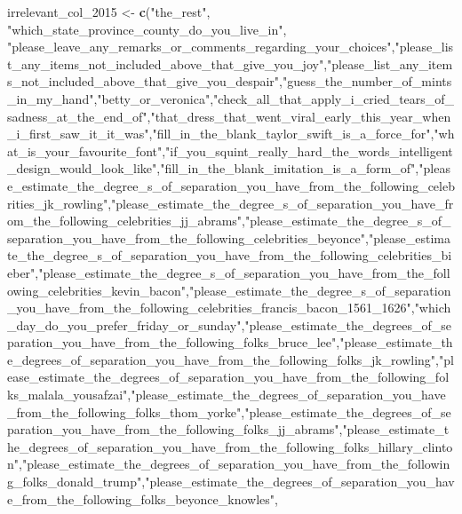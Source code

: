 \documentclass[
]{article}
\newenvironment{Shaded}{\begin{snugshade}}{\end{snugshade}}
\newcommand{\FunctionTok}[1]{\textcolor[rgb]{0.13,0.29,0.53}{\textbf{#1}}}
\newcommand{\NormalTok}[1]{#1}
\newcommand{\OtherTok}[1]{\textcolor[rgb]{0.56,0.35,0.01}{#1}}
\newcommand{\StringTok}[1]{\textcolor[rgb]{0.31,0.60,0.02}{#1}}
\begin{document}
\begin{Shaded}
\begin{Highlighting}[]
\NormalTok{irrelevant\_col\_2015 }\OtherTok{\textless{}{-}} \FunctionTok{c}\NormalTok{(}\StringTok{"the\_rest"}\NormalTok{, }\StringTok{"which\_state\_province\_county\_do\_you\_live\_in"}\NormalTok{,}
               \StringTok{"please\_leave\_any\_remarks\_or\_comments\_regarding\_your\_choices"}\NormalTok{,}\StringTok{"please\_list\_any\_items\_not\_included\_above\_that\_give\_you\_joy"}\NormalTok{,}\StringTok{"please\_list\_any\_items\_not\_included\_above\_that\_give\_you\_despair"}\NormalTok{,}\StringTok{"guess\_the\_number\_of\_mints\_in\_my\_hand"}\NormalTok{,}\StringTok{"betty\_or\_veronica"}\NormalTok{,}\StringTok{"check\_all\_that\_apply\_i\_cried\_tears\_of\_sadness\_at\_the\_end\_of"}\NormalTok{,}\StringTok{"that\_dress\_that\_went\_viral\_early\_this\_year\_when\_i\_first\_saw\_it\_it\_was"}\NormalTok{,}\StringTok{"fill\_in\_the\_blank\_taylor\_swift\_is\_a\_force\_for"}\NormalTok{,}\StringTok{"what\_is\_your\_favourite\_font"}\NormalTok{,}\StringTok{"if\_you\_squint\_really\_hard\_the\_words\_intelligent\_design\_would\_look\_like"}\NormalTok{,}\StringTok{"fill\_in\_the\_blank\_imitation\_is\_a\_form\_of"}\NormalTok{,}\StringTok{"please\_estimate\_the\_degree\_s\_of\_separation\_you\_have\_from\_the\_following\_celebrities\_jk\_rowling"}\NormalTok{,}\StringTok{"please\_estimate\_the\_degree\_s\_of\_separation\_you\_have\_from\_the\_following\_celebrities\_jj\_abrams"}\NormalTok{,}\StringTok{"please\_estimate\_the\_degree\_s\_of\_separation\_you\_have\_from\_the\_following\_celebrities\_beyonce"}\NormalTok{,}\StringTok{"please\_estimate\_the\_degree\_s\_of\_separation\_you\_have\_from\_the\_following\_celebrities\_bieber"}\NormalTok{,}\StringTok{"please\_estimate\_the\_degree\_s\_of\_separation\_you\_have\_from\_the\_following\_celebrities\_kevin\_bacon"}\NormalTok{,}\StringTok{"please\_estimate\_the\_degree\_s\_of\_separation\_you\_have\_from\_the\_following\_celebrities\_francis\_bacon\_1561\_1626"}\NormalTok{,}\StringTok{"which\_day\_do\_you\_prefer\_friday\_or\_sunday"}\NormalTok{,}\StringTok{"please\_estimate\_the\_degrees\_of\_separation\_you\_have\_from\_the\_following\_folks\_bruce\_lee"}\NormalTok{,}\StringTok{"please\_estimate\_the\_degrees\_of\_separation\_you\_have\_from\_the\_following\_folks\_jk\_rowling"}\NormalTok{,}\StringTok{"please\_estimate\_the\_degrees\_of\_separation\_you\_have\_from\_the\_following\_folks\_malala\_yousafzai"}\NormalTok{,}\StringTok{"please\_estimate\_the\_degrees\_of\_separation\_you\_have\_from\_the\_following\_folks\_thom\_yorke"}\NormalTok{,}\StringTok{"please\_estimate\_the\_degrees\_of\_separation\_you\_have\_from\_the\_following\_folks\_jj\_abrams"}\NormalTok{,}\StringTok{"please\_estimate\_the\_degrees\_of\_separation\_you\_have\_from\_the\_following\_folks\_hillary\_clinton"}\NormalTok{,}\StringTok{"please\_estimate\_the\_degrees\_of\_separation\_you\_have\_from\_the\_following\_folks\_donald\_trump"}\NormalTok{,}\StringTok{"please\_estimate\_the\_degrees\_of\_separation\_you\_have\_from\_the\_following\_folks\_beyonce\_knowles"}\NormalTok{,}

\end{Highlighting}
\end{Shaded}
\end{document}
